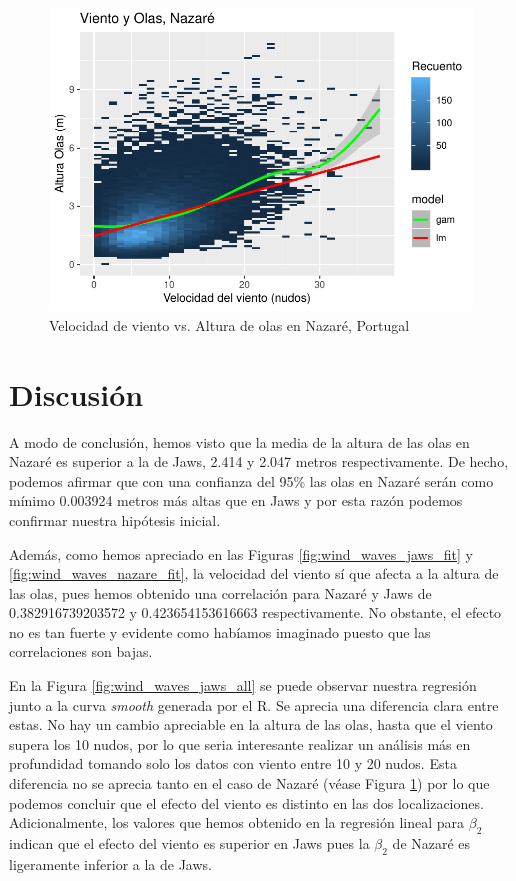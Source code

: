 \begin{figure}[H]
    \centering
    \includegraphics{./figures/nazare_all.pdf}
    \caption{Velocidad de viento vs. Altura de olas en Nazaré, Portugal}
    \label{fig:wind_waves_nazare_all}
\end{figure}

\section{Discusión}%
\label{sec:discusión}

A modo de conclusión, hemos visto que la media de la altura de las olas en Nazaré es superior a la de Jaws,
2.414 y 2.047 metros respectivamente. De hecho, podemos afirmar que con una confianza del 95\% las olas en
Nazaré serán como mínimo 0.003924 metros más altas que en Jaws y por esta razón podemos confirmar
nuestra hipótesis inicial.

Además, como hemos apreciado en las Figuras \ref{fig:wind_waves_jaws_fit} y \ref{fig:wind_waves_nazare_fit}, la velocidad del viento sí que afecta a la altura de las olas, pues hemos obtenido una correlación para Nazaré y Jaws de 0.382916739203572 y 0.423654153616663 respectivamente. No obstante, el efecto no es tan fuerte y evidente como habíamos imaginado puesto que las correlaciones son bajas.

En la Figura \ref{fig:wind_waves_jaws_all} se puede observar nuestra regresión junto a la
curva \emph{smooth} generada por el R. Se aprecia una diferencia clara entre estas.
No hay un cambio apreciable en la altura de las olas, hasta que el viento supera los 10 nudos, por lo que
seria interesante realizar un análisis más en profundidad tomando solo los datos con viento entre 10 y 20 nudos.
Esta diferencia no se aprecia tanto en el caso de Nazaré (véase Figura \ref{fig:wind_waves_nazare_all}) por lo que 
podemos concluir que el efecto del viento es distinto en las dos localizaciones. Adicionalmente, 
los valores que hemos obtenido en la regresión lineal para \(\beta_2\) indican que el efecto del viento es
superior en Jaws pues la \(\beta_2\) de Nazaré es ligeramente inferior a la de Jaws.

